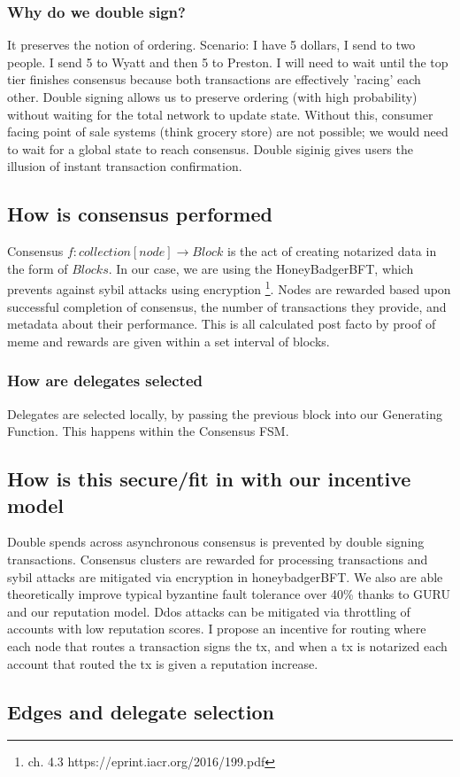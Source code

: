 \documentclass{article}
\begin{document}
\subsubsection{Why do we double sign?}
It preserves the notion of ordering. Scenario: I have 5 dollars, I send to two people. I send 5 to Wyatt and then 5 to Preston. I will need to wait until the top tier finishes consensus because both transactions are effectively 'racing' each other. Double signing allows us to preserve ordering (with high probability) without waiting for the total network to update state. Without this, consumer facing point of sale systems (think grocery store) are not possible; we would need to wait for a global state to reach consensus. Double siginig gives users the illusion of instant transaction confirmation.

\subsection{How is consensus performed}
Consensus $f: collection[node] \rightarrow  Block$ is the act of creating notarized data in the form of $Blocks$. In our case, we are using the HoneyBadgerBFT, which prevents against sybil attacks using encryption \footnote{ch. 4.3 https://eprint.iacr.org/2016/199.pdf}. Nodes are rewarded based upon successful completion of consensus, the number of transactions they provide, and metadata about their performance. This is all calculated post facto by proof of meme and rewards are given within a set interval of blocks.

\subsubsection{How are delegates selected}
Delegates are selected locally, by passing the previous block into our Generating Function. This happens within the Consensus FSM.

\subsection{How is this secure/fit in with our incentive model}
Double spends across asynchronous consensus is prevented by double signing transactions. Consensus clusters are rewarded for processing transactions and sybil attacks are mitigated via encryption in honeybadgerBFT. We also are able theoretically improve typical byzantine fault tolerance over 40\% thanks to GURU and our reputation model. Ddos attacks can be mitigated via throttling of accounts with low reputation scores. I propose an incentive for routing where each node that routes a transaction signs the tx, and when a tx is notarized each account that routed the tx is given a reputation increase.

\subsection{Edges and delegate selection}


\end{document}
